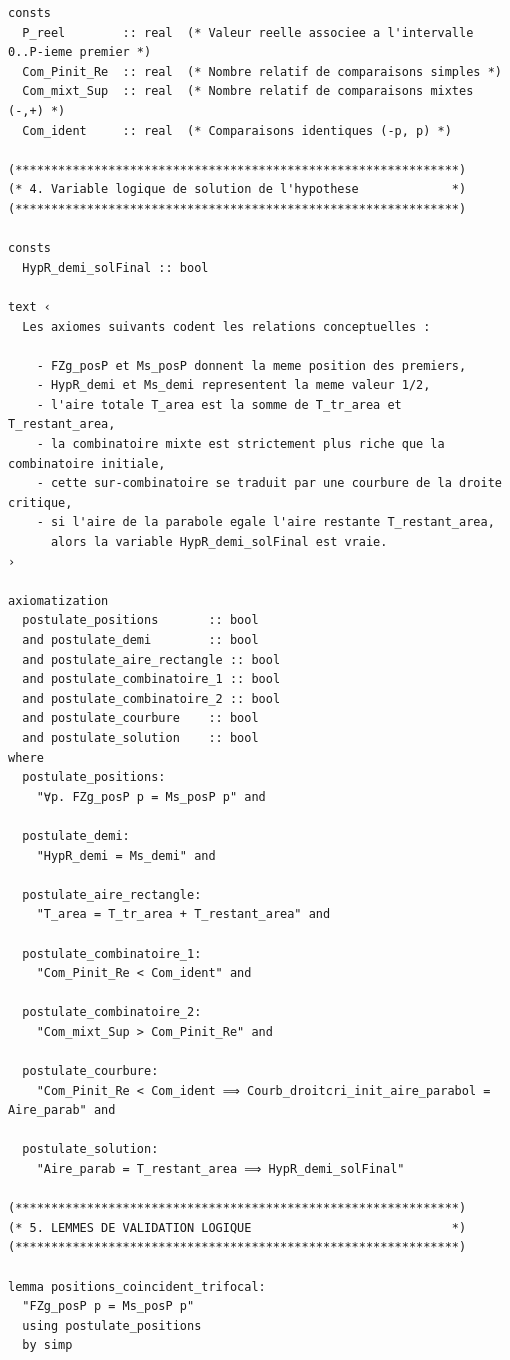 \documentclass[a4paper,11pt]{article}
\begin{document}
\begin{holcode}[title={\textcolor{white}{File: methode\_spectral.thy -- Part 1/4}}]
\begin{lstlisting}
consts
  P_reel        :: real  (* Valeur reelle associee a l'intervalle 0..P-ieme premier *)
  Com_Pinit_Re  :: real  (* Nombre relatif de comparaisons simples *)
  Com_mixt_Sup  :: real  (* Nombre relatif de comparaisons mixtes (-,+) *)
  Com_ident     :: real  (* Comparaisons identiques (-p, p) *)

(**************************************************************)
(* 4. Variable logique de solution de l'hypothese             *)
(**************************************************************)

consts
  HypR_demi_solFinal :: bool

text ‹
  Les axiomes suivants codent les relations conceptuelles :

    - FZg_posP et Ms_posP donnent la meme position des premiers,
    - HypR_demi et Ms_demi representent la meme valeur 1/2,
    - l'aire totale T_area est la somme de T_tr_area et T_restant_area,
    - la combinatoire mixte est strictement plus riche que la combinatoire initiale,
    - cette sur-combinatoire se traduit par une courbure de la droite critique,
    - si l'aire de la parabole egale l'aire restante T_restant_area,
      alors la variable HypR_demi_solFinal est vraie.
›

axiomatization
  postulate_positions       :: bool
  and postulate_demi        :: bool
  and postulate_aire_rectangle :: bool
  and postulate_combinatoire_1 :: bool
  and postulate_combinatoire_2 :: bool
  and postulate_courbure    :: bool
  and postulate_solution    :: bool
where
  postulate_positions:
    "∀p. FZg_posP p = Ms_posP p" and

  postulate_demi:
    "HypR_demi = Ms_demi" and

  postulate_aire_rectangle:
    "T_area = T_tr_area + T_restant_area" and

  postulate_combinatoire_1:
    "Com_Pinit_Re < Com_ident" and

  postulate_combinatoire_2:
    "Com_mixt_Sup > Com_Pinit_Re" and

  postulate_courbure:
    "Com_Pinit_Re < Com_ident ⟹ Courb_droitcri_init_aire_parabol = Aire_parab" and

  postulate_solution:
    "Aire_parab = T_restant_area ⟹ HypR_demi_solFinal"

(**************************************************************)
(* 5. LEMMES DE VALIDATION LOGIQUE                            *)
(**************************************************************)

lemma positions_coincident_trifocal:
  "FZg_posP p = Ms_posP p"
  using postulate_positions
  by simp


\end{lstlisting}
\end{holcode}
\end{document}
